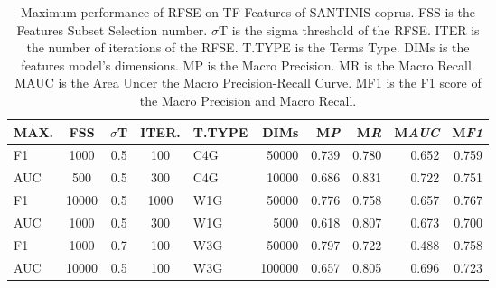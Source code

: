 \begin{table}
\center
\begin{tabular}{|l|ccc|lr|rrrr|}
\hline
MAX. & FSS & $\sigma$T & ITER. & T.TYPE & DIMs & M\emph{P} & M\emph{R} & M\emph{AUC} & M\emph{F1} \\
\hline
F1 & 1000 & 0.5 & 100 & C4G & 50000 & 0.739 & 0.780 & 0.652 & 0.759 \\
AUC & 500 & 0.5 & 300 & C4G & 10000 & 0.686 & 0.831 & 0.722 & 0.751 \\
F1 & 10000 & 0.5 & 1000 & W1G & 50000 & 0.776 & 0.758 & 0.657 & 0.767 \\
AUC & 1000 & 0.5 & 300 & W1G & 5000 & 0.618 & 0.807 & 0.673 & 0.700 \\
F1 & 1000 & 0.7 & 100 & W3G & 50000 & 0.797 & 0.722 & 0.488 & 0.758 \\
AUC & 10000 & 0.5 & 100 & W3G & 100000 & 0.657 & 0.805 & 0.696 & 0.723 \\
\hline
\end{tabular}
\caption {Maximum performance of RFSE on TF Features of SANTINIS coprus. FSS is the Features Subset Selection number. $\sigma$T is the sigma threshold of the RFSE. ITER is the number of iterations of the RFSE. T.TYPE is the Terms Type. DIMs is the features model's dimensions. MP is the Macro Precision. MR is the Macro Recall. MAUC is the Area Under the Macro Precision-Recall Curve. MF1 is the F1 score of the Macro Precision and Macro Recall.}
\label{tbl:RFSE_TF}
\end{table}


